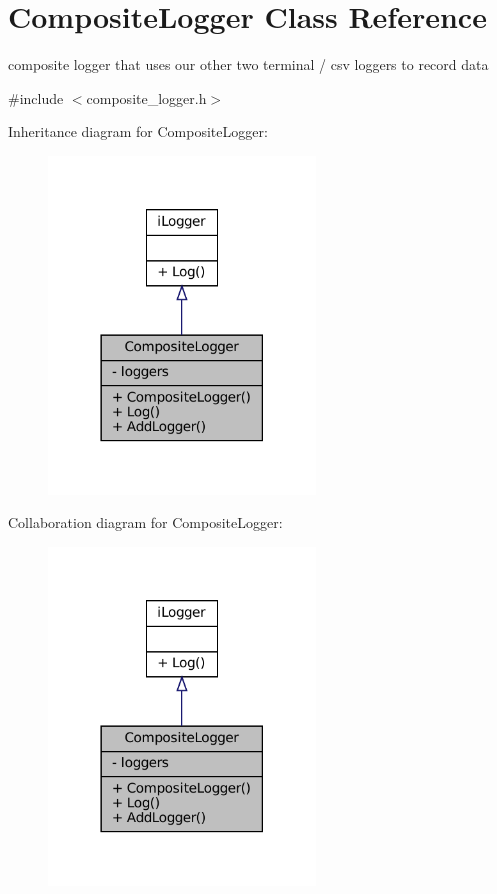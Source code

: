 \hypertarget{classCompositeLogger}{}\section{Composite\+Logger Class Reference}
\label{classCompositeLogger}


composite logger that uses our other two terminal / csv loggers to record data  




{\ttfamily \#include $<$composite\+\_\+logger.\+h$>$}



Inheritance diagram for Composite\+Logger\+:\nopagebreak
\begin{figure}[H]
\begin{center}
\leavevmode
\includegraphics[width=201pt]{classCompositeLogger__inherit__graph}
\end{center}
\end{figure}


Collaboration diagram for Composite\+Logger\+:\nopagebreak
\begin{figure}[H]
\begin{center}
\leavevmode
\includegraphics[width=201pt]{classCompositeLogger__coll__graph}
\end{center}
\end{figure}
